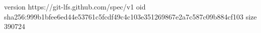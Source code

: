 version https://git-lfs.github.com/spec/v1
oid sha256:999b1bfee6ed44e53761c5fcdf49c4c103e351269867e2a7c587c09b884cf103
size 390724
